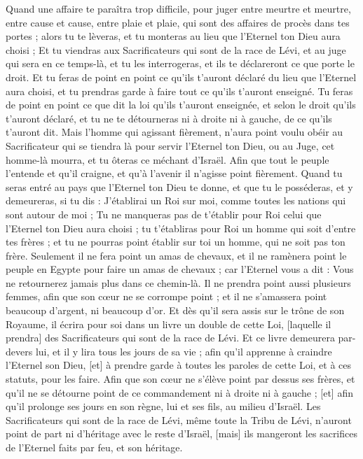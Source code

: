 \begin{multicols}{2}
Quand une affaire te paraîtra trop difficile, pour juger entre meurtre et meurtre, entre cause et cause, entre plaie et plaie, qui sont des affaires de procès dans tes portes ; alors tu te lèveras, et tu monteras au lieu que l'Eternel ton Dieu aura choisi ;
Et tu viendras aux Sacrificateurs qui sont de la race de Lévi, et au juge qui sera en ce temps-là, et tu les interrogeras, et ils te déclareront ce que porte le droit.
Et tu feras de point en point ce qu'ils t'auront déclaré du lieu que l'Eternel aura choisi, et tu prendras garde à faire tout ce qu'ils t'auront enseigné.
Tu feras de point en point ce que dit la loi qu'ils t'auront enseignée, et selon le droit qu'ils t'auront déclaré, et tu ne te détourneras ni à droite ni à gauche, de ce qu'ils t'auront dit.
Mais l'homme qui agissant fièrement, n'aura point voulu obéir au Sacrificateur qui se tiendra là pour servir l'Eternel ton Dieu, ou au Juge, cet homme-là mourra, et tu ôteras ce méchant d'Israël.
Afin que tout le peuple l'entende et qu'il craigne, et qu'à l'avenir il n'agisse point fièrement.
Quand tu seras entré au pays que l'Eternel ton Dieu te donne, et que tu le posséderas, et y demeureras, si tu dis : J'établirai un Roi sur moi, comme toutes les nations qui sont autour de moi ;
Tu ne manqueras pas de t'établir pour Roi celui que l'Eternel ton Dieu aura choisi ; tu t'établiras pour Roi un homme qui soit d'entre tes frères ; et tu ne pourras point établir sur toi un homme, qui ne soit pas ton frère.
Seulement il ne fera point un amas de chevaux, et il ne ramènera point le peuple en Egypte pour faire un amas de chevaux ; car l'Eternel vous a dit : Vous ne retournerez jamais plus dans ce chemin-là.
Il ne prendra point aussi plusieurs femmes, afin que son cœur ne se corrompe point ; et il ne s'amassera point beaucoup d'argent, ni beaucoup d'or.
Et dès qu'il sera assis sur le trône de son Royaume, il écrira pour soi dans un livre un double de cette Loi, [laquelle il prendra] des Sacrificateurs qui sont de la race de Lévi.
Et ce livre demeurera par-devers lui, et il y lira tous les jours de sa vie ; afin qu'il apprenne à craindre l'Eternel son Dieu, [et] à prendre garde à toutes les paroles de cette Loi, et à ces statuts, pour les faire.
Afin que son cœur ne s'élève point par dessus ses frères, et qu'il ne se détourne point de ce commandement ni à droite ni à gauche ; [et] afin qu'il prolonge ses jours en son règne, lui et ses fils, au milieu d'Israël.
\VerseOne{}Les Sacrificateurs qui sont de la race de Lévi, même toute la Tribu de Lévi, n'auront point de part ni d'héritage avec le reste d'Israël, [mais] ils mangeront les sacrifices de l'Eternel faits par feu, et son héritage.

\end{multicols}
